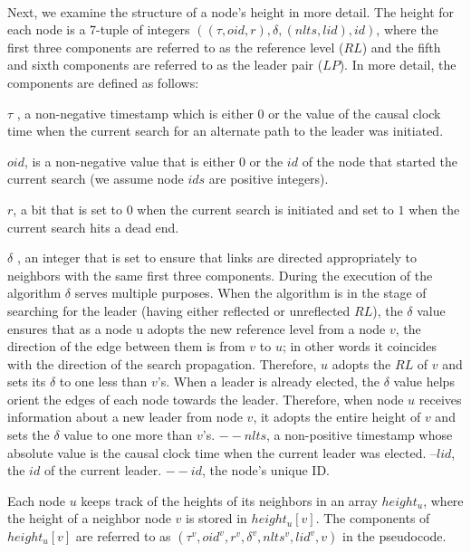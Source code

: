 \paragraph{}Next, we examine the structure of a node’s height in more detail. The height for each node is a 7-tuple of integers $((\tau , oid, r), \delta , (nlts, lid), id)$, where the first three components are referred to as the reference level ($RL$) and the fifth and sixth components are referred to as the leader pair ($LP$). In more detail, the components are defined as follows:
\begin{list}{--}{spacing}
	\item $\tau$ , a non-negative timestamp which is either $0$ or the value of the causal clock time when the current search for an alternate path to the leader was initiated.
	\item $oid$, is a non-negative value that is either $0$ or the $id$ of the node that started the current search (we assume node $ids$ are positive integers).
	\item $r$, a bit that is set to $0$ when the current search is initiated and set to $1$ when the current search hits a dead end.
	\item  $\delta$ , an integer that is set to ensure that links are directed appropriately to neighbors with the same first three components. During the execution of the algorithm $\delta$ serves multiple purposes. When the algorithm is in the stage of searching for the leader (having either reflected or unreflected $RL$), the $\delta$ value ensures that as a node u adopts the new reference level from a node $v$, the direction of the edge between them is from $v$ to $u$; in other words it coincides with the direction of the search propagation. Therefore, $u$ adopts the $RL$ of $v$ and sets its $\delta$ to one less than $v$’s. When a leader is already elected, the $\delta$ value helps orient the edges of each node towards the leader. Therefore, when node $u$ receives information about a new leader from node $v$, it adopts the entire height of $v$ and sets the $\delta$ value to one more than $v$’s. $-- nlts$, a non-positive timestamp whose absolute value is the causal clock time when the current leader was elected. $– lid$, the $id$ of the current leader. $-- id$, the node’s unique ID.
\end{list}
Each node $u$ keeps track of the heights of its neighbors in an array $height_u$, where the height of a neighbor node $v$ is stored in $height_u[v]$. The components of $height_u[v]$ are referred to as $(\tau ^v , oid^v , r^v , \delta ^v , nlts^v , lid^v , v)$ in the pseudocode.
